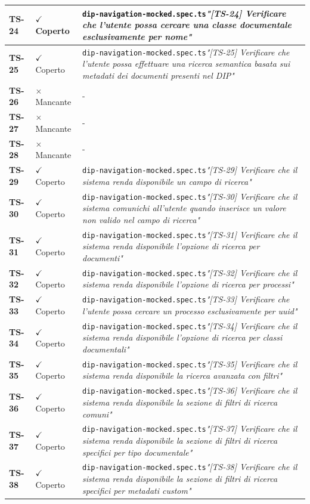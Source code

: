 \documentclass[a4paper,12pt]{article}
\newcommand{\ok}{\textcolor{green!60!black}{$\checkmark$ Coperto}}
\newcommand{\ko}{\textcolor{red!80!black}{$\times$ Mancante}}
\newcommand{\f}[1]{\nolinkurl{#1}\newline}
\newcommand{\q}[1]{\textit{#1}}
\begin{document}
\begin{longtable}{|p{1.5cm}|p{3.0cm}|p{10.5cm}|}
\textbf{TS-24} & \ok & \f{dip-navigation-mocked.spec.ts}\q{"[TS-24] Verificare che l'utente possa cercare una classe documentale esclusivamente per nome"} \\ \hline
\textbf{TS-25} & \ok & \f{dip-navigation-mocked.spec.ts}\q{"[TS-25] Verificare che l'utente possa effettuare una ricerca semantica basata sui metadati dei documenti presenti nel DIP"} \\ \hline
\textbf{TS-26} & \ko & - \\ \hline
\textbf{TS-27} & \ko & - \\ \hline
\textbf{TS-28} & \ko & - \\ \hline
\textbf{TS-29} & \ok & \f{dip-navigation-mocked.spec.ts}\q{"[TS-29] Verificare che il sistema renda disponibile un campo di ricerca"} \\ \hline
\textbf{TS-30} & \ok & \f{dip-navigation-mocked.spec.ts}\q{"[TS-30] Verificare che il sistema comunichi all'utente quando inserisce un valore non valido nel campo di ricerca"} \\ \hline
\textbf{TS-31} & \ok & \f{dip-navigation-mocked.spec.ts}\q{"[TS-31] Verificare che il sistema renda disponibile l'opzione di ricerca per documenti"} \\ \hline
\textbf{TS-32} & \ok & \f{dip-navigation-mocked.spec.ts}\q{"[TS-32] Verificare che il sistema renda disponibile l'opzione di ricerca per processi"} \\ \hline
\textbf{TS-33} & \ok & \f{dip-navigation-mocked.spec.ts}\q{"[TS-33] Verificare che l'utente possa cercare un processo esclusivamente per uuid"} \\ \hline
\textbf{TS-34} & \ok & \f{dip-navigation-mocked.spec.ts}\q{"[TS-34] Verificare che il sistema renda disponibile l'opzione di ricerca per classi documentali"} \\ \hline
\textbf{TS-35} & \ok & \f{dip-navigation-mocked.spec.ts}\q{"[TS-35] Verificare che il sistema renda disponibile la ricerca avanzata con filtri"} \\ \hline
\textbf{TS-36} & \ok & \f{dip-navigation-mocked.spec.ts}\q{"[TS-36] Verificare che il sistema renda disponibile la sezione di filtri di ricerca comuni"} \\ \hline
\textbf{TS-37} & \ok & \f{dip-navigation-mocked.spec.ts}\q{"[TS-37] Verificare che il sistema renda disponibile la sezione di filtri di ricerca specifici per tipo documentale"} \\ \hline
\textbf{TS-38} & \ok & \f{dip-navigation-mocked.spec.ts}\q{"[TS-38] Verificare che il sistema renda disponibile la sezione di filtri di ricerca specifici per metadati custom"} \\ \hline

\end{longtable}
\end{document}
